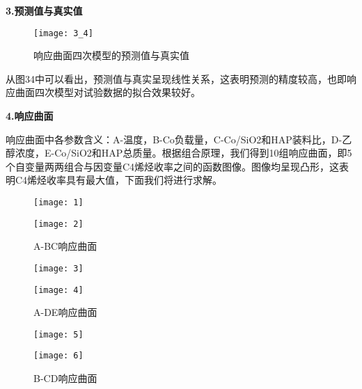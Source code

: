\documentclass[withoutpreface,bwprint]{cumcmthesis} %
\begin{document}
\bigskip
\textbf{3.预测值与真实值}

\begin{figure}[!h]
	\centering
	\texttt{[image: 3\_4]}
	\caption{响应曲面四次模型的预测值与真实值}
	\label{fig:circuit-diagram1}
\end{figure}
从图34中可以看出，预测值与真实呈现线性关系，这表明预测的精度较高，也即响应曲面四次模型对试验数据的拟合效果较好。


\newpage
\textbf{4.响应曲面}

响应曲面中各参数含义：A-温度，B-Co负载量，C-Co/SiO2和HAP装料比，D-乙醇浓度，E-Co/SiO2和HAP总质量。根据组合原理，我们得到10组响应曲面，即5个自变量两两组合与因变量C4烯烃收率之间的函数图像。图像均呈现凸形，这表明C4烯烃收率具有最大值，下面我们将进行求解。

\begin{figure}[!h]
	\centering
	\begin{minipage}[c]{0.45\textwidth}
		\centering
		\texttt{[image: 1]}
		\label{fig:sample-figure-a}
	\end{minipage}
	\begin{minipage}[c]{0.45\textwidth}
		\centering
		\texttt{[image: 2]}
		\label{fig:sample-figure-b}
	\end{minipage}
	\caption{A-BC响应曲面}
	\label{fig:sample-figure}
\end{figure}

\begin{figure}[!h]
	\centering
	\begin{minipage}[c]{0.45\textwidth}
		\centering
		\texttt{[image: 3]}
		\label{fig:sample-figure-a}
	\end{minipage}
	\begin{minipage}[c]{0.45\textwidth}
		\centering
		\texttt{[image: 4]}
		\label{fig:sample-figure-b}
	\end{minipage}
	\caption{A-DE响应曲面}
	\label{fig:sample-figure}
\end{figure}

\begin{figure}[!h]
	\centering
	\begin{minipage}[c]{0.45\textwidth}
		\centering
		\texttt{[image: 5]}
		\label{fig:sample-figure-a}
	\end{minipage}
	\begin{minipage}[c]{0.45\textwidth}
		\centering
		\texttt{[image: 6]}
		\label{fig:sample-figure-b}
	\end{minipage}
	\caption{B-CD响应曲面}
	\label{fig:sample-figure}
\end{figure}
\end{document}
